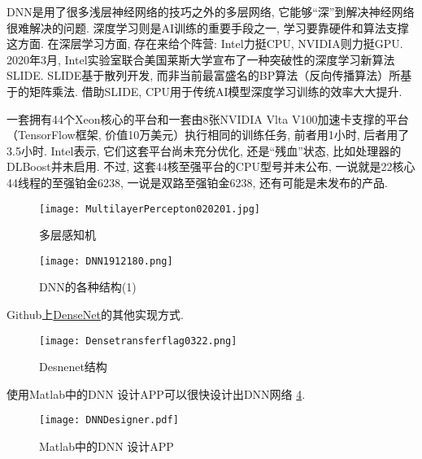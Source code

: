 DNN是用了很多浅层神经网络的技巧之外的多层网络, 它能够“深”到解决神经网络很难解决的问题.
深度学习则是AI训练的重要手段之一,  学习要靠硬件和算法支撑 这方面.
在深层学习方面, 存在来给个阵营: Intel力挺CPU, NVIDIA则力挺GPU.
2020年3月, Intel实验室联合美国莱斯大学宣布了一种突破性的深度学习新算法SLIDE.
SLIDE基于散列开发, 而非当前最富盛名的BP算法（反向传播算法）所基于的矩阵乘法.
借助SLIDE, CPU用于传统AI模型深度学习训练的效率大大提升.
\begin{exampleT}
    一套拥有44个Xeon核心的平台和一套由8张NVIDIA Vlta V100加速卡支撑的平台（TensorFlow框架, 价值10万美元）执行相同的训练任务, 前者用1小时, 后者用了3.5小时.
Intel表示, 它们这套平台尚未充分优化, 还是“残血”状态, 比如处理器的DLBoost并未启用.
不过, 这套44核至强平台的CPU型号并未公布, 一说就是22核心44线程的至强铂金6238, 一说是双路至强铂金6238, 还有可能是未发布的产品.
\end{exampleT}
\begin{figure}[H]
\centering
\texttt{[image: MultilayerPercepton020201.jpg]}
\caption{多层感知机}
\label{MultilayerPercepton020201}
\end{figure}
\begin{figure}[H]
\centering
\texttt{[image: DNN1912180.png]}
\caption{DNN的各种结构(1)}
\label{DNN191218121500010}
\end{figure}
Github上\href{https://github.com/zggl/DenseNet}{DenseNet}的其他实现方式.
\begin{figure}[H]
\centering
\texttt{[image: Densetransferflag0322.png]}
\caption{Desnenet结构}
\label{Densetransferflag03220304}
\end{figure}

使用Matlab中的DNN 设计APP可以很快设计出DNN网络 \ref{DNNDesigner20200304}.
\begin{figure}[H]
\centering
\texttt{[image: DNNDesigner.pdf]}
\caption{Matlab中的DNN 设计APP}
\label{DNNDesigner20200304}
\end{figure}
